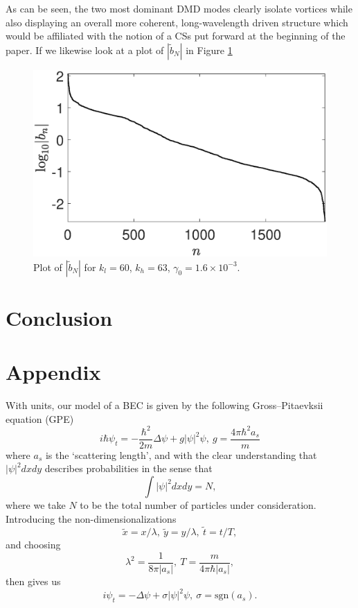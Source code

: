 \documentclass[a4paper,11pt]{article}
\begin{document}
As can be seen, the two most dominant DMD modes clearly isolate vortices while also displaying an overall more coherent, long-wavelength driven structure which would be affiliated with the notion of a CSs put forward at the beginning of the paper.  If we likewise look at a plot of $\left|\tilde{b}_{N}\right|$ in Figure \ref{fig:bmmagshf}
\begin{figure}[!h]
\centering
\includegraphics[width=.7\textwidth]{dmd_mags_hfforce_K_256_Lx_128_tf_1pt5e4}
\caption{Plot of $\left|\tilde{b}_{N}\right|$ for $k_{l}=60$, $k_{h}=63$, $\gamma_{0}=1.6\times 10^{-3}$.}
\label{fig:bmmagshf}
\end{figure}
\section*{Conclusion}

\section*{Appendix}
With units, our model of a BEC is given by the following Gross--Pitaevksii equation (GPE)
\[
i\hbar\psi_{t} = -\frac{\hbar^{2}}{2m}\Delta \psi + g\left| \psi\right|^{2}\psi, ~ g = \frac{4\pi \hbar^{2}a_{s}}{m}
\]
where $a_{s}$ is the `scattering length', and with the clear understanding that $\left|\psi\right|^{2}dxdy$ describes probabilities in the sense that 
\[
\int |\psi|^{2}dxdy = N,
\]
where we take $N$ to be the total number of particles under consideration.  Introducing the non-dimensionalizations 
\[
\tilde{x} = x/\lambda, ~ \tilde{y} = y/\lambda, ~ \tilde{t} = t/T, 
\]
and choosing
\[
\lambda^{2} = \frac{1}{8\pi |a_{s}|}, ~ T = \frac{m}{4\pi\hbar |a_{s}|}, 
\] 
then gives us
\[
i\psi_{t} = -\Delta \psi + \sigma\left| \psi\right|^{2}\psi,  ~\sigma = \mbox{sgn}(a_{s}).
\]



\end{document}
